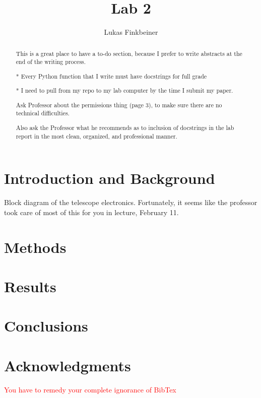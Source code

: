 \documentclass[a4paper]{article}
\title{Lab 2}
\author{Lukas Finkbeiner}
\begin{document}
\maketitle

\begin{abstract}

This is a great place to have a to-do section, because I prefer to write abstracts at the end of the writing process.

* Every Python function that I write must have docstrings for full grade

* I need to pull from my repo to my lab computer by the time I submit my paper.

\quad * Ask Professor about the permissions thing (page 3), to make sure there are no technical difficulties.

\quad * Also ask the Professor what he recommends as to inclusion of docstrings in the lab report in the most clean, organized, and professional manner.

\end{abstract}


\section{Introduction and Background}

Block diagram of the telescope electronics. Fortunately, it seems like the professor took care of most of this for you in lecture, February 11.

\section{Methods}

\section{Results}

\section{Conclusions}

\section{Acknowledgments}

\textcolor{red}{You have to remedy your complete ignorance of BibTex}
\end{document}
